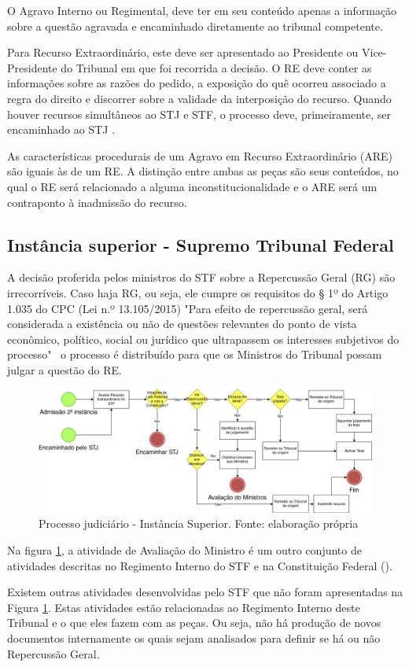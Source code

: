 O Agravo Interno ou Regimental, deve ter em seu conteúdo apenas a informação sobre a questão agravada e encaminhado diretamente ao tribunal competente.

Para Recurso Extraordinário, este deve ser apresentado ao Presidente ou Vice-Presidente do Tribunal em que foi recorrida a decisão. O RE deve conter as informações sobre as razões do pedido, a exposição do quê ocorreu associado a regra do direito e discorrer sobre a validade da interposição do recurso. Quando houver recursos simultâneos ao STJ e STF, o processo deve, primeiramente, ser encaminhado ao STJ \cite{BRASIL2015}.

As características procedurais de um Agravo em Recurso Extraordinário (ARE) são iguais às de um RE. A distinção entre ambas as peças são seus conteúdos, no qual o RE será relacionado a alguma inconstitucionalidade e o ARE será um contraponto à inadmissão do recurso.

\subsection{Instância superior - Supremo Tribunal Federal}

A decisão proferida pelos ministros do STF sobre a Repercussão Geral (RG) são irrecorríveis. Caso haja RG, ou seja, ele cumpre os requisitos do § 1º do Artigo 1.035 do CPC (Lei n.º 13.105/2015)
"Para efeito de repercussão geral, será considerada a existência ou não de questões relevantes do ponto de vista econômico, político, social ou jurídico que ultrapassem os interesses subjetivos do processo"\ \cite{BRASIL2015} o processo é distribuído para que os Ministros do Tribunal possam julgar a questão do RE. 

\begin{figure}[h]
	\centering
    \includegraphics[keepaspectratio=true,scale=0.4]{figuras/processoSuperior}
	\caption[Processo judiciário - Instância Superior]{Processo judiciário - Instância Superior. Fonte: elaboração própria}
	\label{fig:processoSuperior}
\end{figure}

Na figura \ref{fig:processoSuperior}, a atividade de Avaliação do Ministro é um outro conjunto de atividades descritas no Regimento Interno do STF \cite{STF2016} e na Constituição Federal (\citeyear{BRASIL1988}). 

Existem outras atividades desenvolvidas pelo STF que não foram apresentadas na Figura \ref{fig:processoSuperior}. Estas atividades estão relacionadas ao Regimento Interno \cite{STF2016} deste Tribunal e o que eles fazem com as peças. Ou seja, não há produção de novos documentos internamente os quais sejam analisados para definir se há ou não Repercussão Geral.